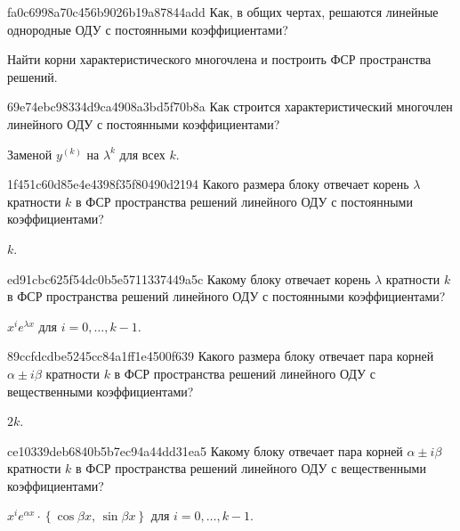 \begin{note}{fa0c6998a70c456b9026b19a87844add}
    Как, в общих чертах, решаются линейные однородные ОДУ с постоянными коэффициентами?

    \begin{cloze}{1}
        Найти корни характеристического многочлена и построить ФСР пространства решений.
    \end{cloze}
\end{note}

\begin{note}{69e74ebc98334d9ca4908a3bd5f70b8a}
    Как строится характеристический многочлен линейного ОДУ с постоянными коэффициентами?

    \begin{cloze}{1}
        Заменой \({ y^{(k)} }\) на \({ \lambda^{k} }\) для всех \({ k }\).
    \end{cloze}
\end{note}

\begin{note}{1f451c60d85e4e4398f35f80490d2194}
    Какого размера блоку отвечает корень \({ \lambda }\) кратности \({ k }\) в ФСР пространства решений линейного ОДУ с постоянными коэффициентами?

    \begin{cloze}{1}
        \({ k }\).
    \end{cloze}
\end{note}

\begin{note}{ed91cbc625f54dc0b5e5711337449a5c}
    Какому блоку отвечает корень \({ \lambda }\) кратности \({ k }\) в ФСР пространства решений линейного ОДУ с постоянными коэффициентами?

    \begin{cloze}{1}
        \({ x^{i} e^{\lambda x} }\) для \({ i = 0, \ldots, k-1 }\).
    \end{cloze}
\end{note}

\begin{note}{89ccfdcdbe5245cc84a1ff1e4500f639}
    Какого размера блоку отвечает пара корней \({ \alpha \pm i \beta }\) кратности \({ k }\) в ФСР пространства решений линейного ОДУ с вещественными коэффициентами?

    \begin{cloze}{1}
        \({ 2k }\).
    \end{cloze}
\end{note}

\begin{note}{ce10339deb6840b5b7ec94a44dd31ea5}
    Какому блоку отвечает пара корней \({ \alpha \pm i \beta }\) кратности \({ k }\) в ФСР пространства решений линейного ОДУ с вещественными коэффициентами?

    \begin{cloze}{1}
        \({ x^{i} e^{\alpha x} \cdot \left\{ \cos \beta x,\, \sin \beta x \right\} }\) для \({ i = 0, \ldots, k-1 }\).
    \end{cloze}
\end{note}

